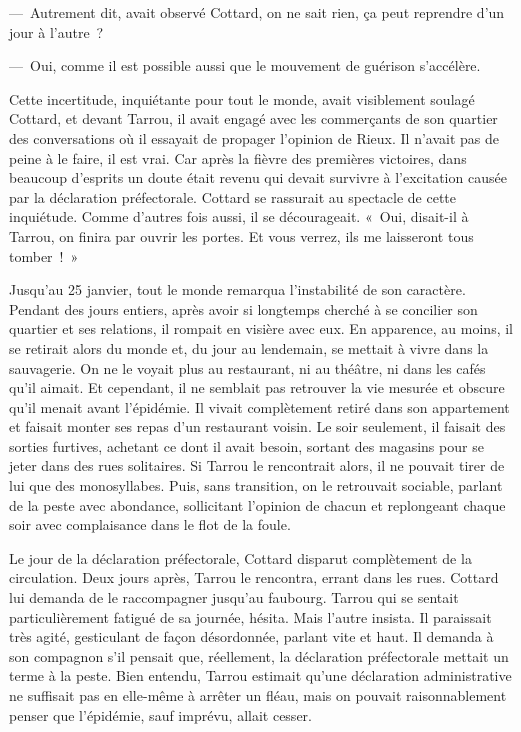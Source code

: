 \documentclass[french,twoside]{book} %
\begin{document}
— Autrement dit, avait observé Cottard, on ne sait rien, ça peut reprendre d’un jour à l’autre ?\par
— Oui, comme il est possible aussi que le mouvement de guérison s’accélère.\par
Cette incertitude, inquiétante pour tout le monde, avait visiblement soulagé Cottard, et devant Tarrou, il avait engagé avec les commerçants de son quartier des conversations où il essayait de propager l’opinion de Rieux. Il n’avait pas de peine à le faire, il est vrai. Car après la fièvre des premières victoires, dans beaucoup d’esprits un doute était revenu qui devait survivre à l’excitation causée par la déclaration préfectorale. Cottard se rassurait au spectacle de cette inquiétude. Comme d’autres fois aussi, il se décourageait. « Oui, disait-il à Tarrou, on finira par ouvrir les portes. Et vous verrez, ils me laisseront tous tomber ! »\par
Jusqu’au 25 janvier, tout le monde remarqua l’instabilité de son caractère. Pendant des jours entiers, après avoir si longtemps cherché à se concilier son quartier et ses relations, il rompait en visière avec eux. En apparence, au moins, il se retirait alors du monde et, du jour au lendemain, se mettait à vivre dans la sauvagerie. On ne le voyait plus au restaurant, ni au théâtre, ni dans les cafés qu’il aimait. Et cependant, il ne semblait pas retrouver la vie mesurée et obscure qu’il menait avant l’épidémie. Il vivait complètement retiré dans son appartement et faisait monter ses repas d’un restaurant voisin. Le soir seulement, il faisait des sorties furtives, achetant ce dont il avait besoin, sortant des magasins pour se jeter dans des rues solitaires. Si Tarrou le rencontrait alors, il ne pouvait tirer de lui que des monosyllabes. Puis, sans transition, on le retrouvait sociable, parlant de la peste avec abondance, sollicitant l’opinion de chacun et replongeant chaque soir avec complaisance dans le flot de la foule.\par
Le jour de la déclaration préfectorale, Cottard disparut complètement de la circulation. Deux jours après, Tarrou le rencontra, errant dans les rues. Cottard lui demanda de le raccompagner jusqu’au faubourg. Tarrou qui se sentait particulièrement fatigué de sa journée, hésita. Mais l’autre insista. Il paraissait très agité, gesticulant de façon désordonnée, parlant vite et haut. Il demanda à son compagnon s’il pensait que, réellement, la déclaration préfectorale mettait un terme à la peste. Bien entendu, Tarrou estimait qu’une déclaration administrative ne suffisait pas en elle-même à arrêter un fléau, mais on pouvait raisonnablement penser que l’épidémie, sauf imprévu, allait cesser.\par
\end{document}
